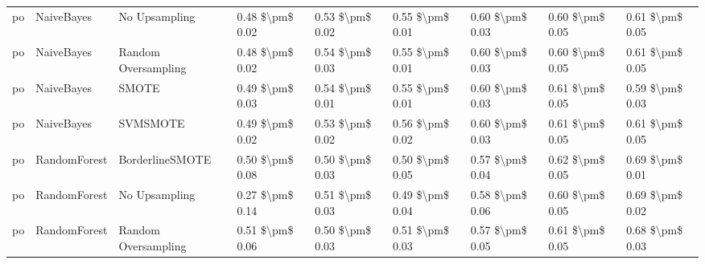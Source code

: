 \begin{tabular}{lllllllll}
      po &                      NaiveBayes &                 No Upsampling & 0.48 \$\textbackslash pm\$ 0.02 &           0.53 \$\textbackslash pm\$ 0.02 &       0.55 \$\textbackslash pm\$ 0.01 &        0.60 \$\textbackslash pm\$ 0.03 &                         0.60 \$\textbackslash pm\$ 0.05 &     0.61 \$\textbackslash pm\$ 0.05 \\
      po &                      NaiveBayes &           Random Oversampling & 0.48 \$\textbackslash pm\$ 0.02 &           0.54 \$\textbackslash pm\$ 0.03 &       0.55 \$\textbackslash pm\$ 0.01 &        0.60 \$\textbackslash pm\$ 0.03 &                         0.60 \$\textbackslash pm\$ 0.05 &     0.61 \$\textbackslash pm\$ 0.05 \\
      po &                      NaiveBayes &                         SMOTE & 0.49 \$\textbackslash pm\$ 0.03 &           0.54 \$\textbackslash pm\$ 0.01 &       0.55 \$\textbackslash pm\$ 0.01 &        0.60 \$\textbackslash pm\$ 0.03 &                         0.61 \$\textbackslash pm\$ 0.05 &     0.59 \$\textbackslash pm\$ 0.03 \\
      po &                      NaiveBayes &                      SVMSMOTE & 0.49 \$\textbackslash pm\$ 0.02 &           0.53 \$\textbackslash pm\$ 0.02 &       0.56 \$\textbackslash pm\$ 0.02 &        0.60 \$\textbackslash pm\$ 0.03 &                         0.61 \$\textbackslash pm\$ 0.05 &     0.61 \$\textbackslash pm\$ 0.05 \\
      po &                    RandomForest &               BorderlineSMOTE & 0.50 \$\textbackslash pm\$ 0.08 &           0.50 \$\textbackslash pm\$ 0.03 &       0.50 \$\textbackslash pm\$ 0.05 &        0.57 \$\textbackslash pm\$ 0.04 &                         0.62 \$\textbackslash pm\$ 0.05 &     0.69 \$\textbackslash pm\$ 0.01 \\
      po &                    RandomForest &                 No Upsampling & 0.27 \$\textbackslash pm\$ 0.14 &           0.51 \$\textbackslash pm\$ 0.03 &       0.49 \$\textbackslash pm\$ 0.04 &        0.58 \$\textbackslash pm\$ 0.06 &                         0.60 \$\textbackslash pm\$ 0.05 &     0.69 \$\textbackslash pm\$ 0.02 \\
      po &                    RandomForest &           Random Oversampling & 0.51 \$\textbackslash pm\$ 0.06 &           0.50 \$\textbackslash pm\$ 0.03 &       0.51 \$\textbackslash pm\$ 0.03 &        0.57 \$\textbackslash pm\$ 0.05 &                         0.61 \$\textbackslash pm\$ 0.05 &     0.68 \$\textbackslash pm\$ 0.03 \\

\end{tabular}
